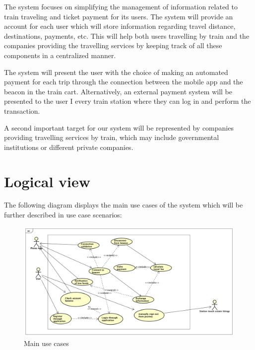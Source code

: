 The system focuses on simplifying the management of information related to train traveling and ticket payment for its users. The system will provide an account for each user which will store information regarding travel distance, destinations, payments, etc. This will help both users travelling by train and the companies providing the travelling services by keeping track of all these components in a centralized manner. 

The system will present the user with the choice of making an automated payment for each trip through the connection between the mobile app and the beacon in the train cart. Alternatively, an external payment system will be presented to the user I every train station where they can log in and perform the transaction. 

A second important target for our system will be represented by companies providing travelling services by train, which may include governmental institutions or different private companies.

\section{Logical view}

The following diagram displays the main use cases of the system which will be further described in use case scenarios:

\begin{figure}[H]
	\centering
	\includegraphics[width=\textwidth]{Pictures/main_use_cases.png}
	\caption{Main use cases}
	\label{fig:main_use_cases}
\end{figure}

